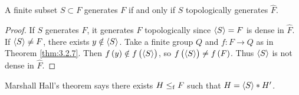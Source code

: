 \begin{corollary}
A finite subset $ S \subset F $ generates $ F $ if and only if $ S $ topologically generates $ \widehat{F} $.
\end{corollary}

\begin{proof}
If $ S $ generates $ F $, it generates $ \widehat{F} $ topologically since $ \left\langle S \right\rangle = F $ is dense in $ \widehat{F} $. If $ \left\langle S \right\rangle \ne F $, there exists $ y \notin \left\langle S \right\rangle $. Take a finite group $ Q $ and $ f : F \to Q $ as in Theorem \ref{thm:3.2.7}. Then $ f\br{y} \notin f\br{\abr{S}} $, so $ f\br{\abr{S}} \ne f\br{F} $. Thus $ \left\langle S \right\rangle $ is not dense in $ \widehat{F} $.
\end{proof}

Marshall Hall's theorem says there exists $ H \le_{\mathrm{f}} F $ such that $ H = \left\langle S \right\rangle * H' $.

\pagebreak


